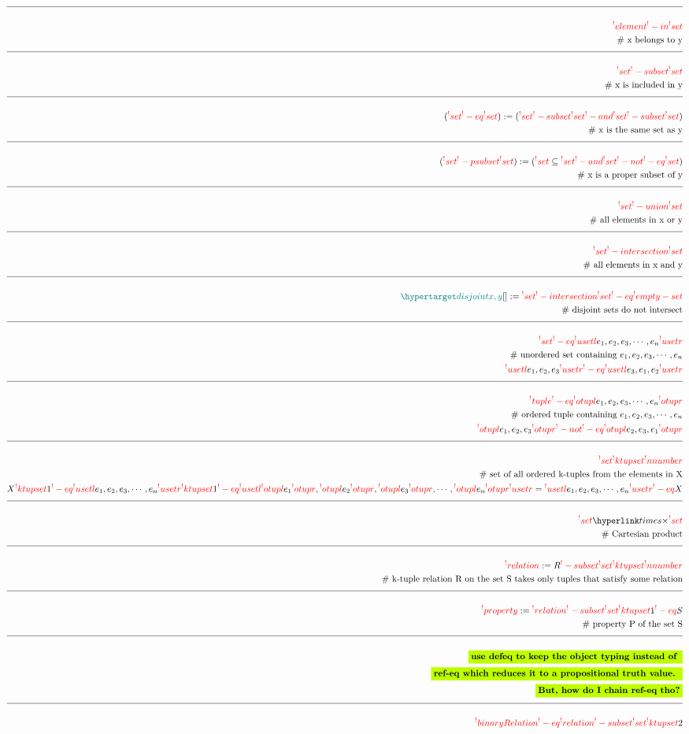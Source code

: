 \documentclass[a4paper]{article}
\newcommand{\tdb}[1]{\colorbox{lime}{$\displaystyle #1$}}
\newcommand{\defeq}{:=}
\newcommand{\enlist}[2]{{#1}_{1}, {#1}_{2}, {#1}_{3}, \cdots, {#1}_{#2}}
\newcommand{\eqComment}[1]{\text{  \# #1}}
\newcommand{\n}{\\[1.5ex] \hline \nonumber \\[0ex]}
\newcommand{\m}{\nonumber \\}
\begin{document}
\begin{tcolorbox}
\begin{align}
\n \rfr{element} [x][] \rfr{-in} \rfr{set} [y][] %
\m \eqComment{x belongs to y}
\n \rfr{set} [x][] \rfr{-subset} \rfr{set} [y][]
\m \eqComment{x is included in y}
\n (\rfr{set} [x][] \rfr{-eq} \rfr{set} [y][]) \defeq (\rfr{set} [x][] \rfr{-subset} \rfr{set} [y][] \rfr{-and} \rfr{set} [y][] \rfr{-subset} \rfr{set} [x][])
\m \eqComment{x is the same set as y}
\n (\rfr{set} [x][] \rfr{-psubset} \rfr{set} [y][]) \defeq (\rfr{set} [x][] \subseteq \rfr{set} [y][] \rfr{-and} \rfr{set} [x][] \rfr{-not} \rfr{-eq} \rfr{set} [y][])
\m \eqComment{x is a proper subset of y}
\n \rfr{set} [x][] \rfr{-union} \rfr{set} [y][]
\m \eqComment{all elements in x or y}
\n \rfr{set} [x][] \rfr{-intersection} \rfr{set} [y][]
\m \eqComment{all elements in x and y}
\n \dfn{disjoint} [x, y][] \defeq \rfr{set} [x][] \rfr{-intersection} \rfr{set} [y][] \rfr{-eq} \rfr{empty-set}
\m \eqComment{disjoint sets do not intersect}
\n \rfr{set} [E][] \rfr{-eq} \rfr{usetl} \enlist{e}{n} \rfr{usetr}
\m \eqComment{unordered set containing $\enlist{e}{n}$}
\m \rfr{usetl} e_1, e_2, e_3 \rfr{usetr} \rfr{-eq} \rfr{usetl} e_3, e_1, e_2 \rfr{usetr}
\n \rfr{tuple} [E][] \rfr{-eq} \rfr{otupl} \enlist{e}{n} \rfr{otupr} 
\m \eqComment{ordered tuple containing $\enlist{e}{n}$}
\m \rfr{otupl} e_1, e_2, e_3 \rfr{otupr} \rfr{-not} \rfr{-eq} \rfr{otupl} e_2, e_3, e_1 \rfr{otupr}
\n \rfr{set} [X][] \rfr{ktupset} \rfr{nnumber} [k][]
\m \eqComment{set of all ordered k-tuples from the elements in X}
\m X \rfr{ktupset} 1 \rfr{-eq} \rfr{usetl} \enlist{e}{n} \rfr{usetr} \rfr{ktupset} 1 \rfr{-eq} \rfr{usetl} \rfr{otupl} e_1 \rfr{otupr}, \rfr{otupl} e_2 \rfr{otupr}, \rfr{otupl} e_3 \rfr{otupr}, \cdots, \rfr{otupl} e_n \rfr{otupr} \rfr{usetr} = \rfr{usetl} \enlist{e}{n} \rfr{usetr} \rfr{-eq} X
\n \rfr{set} [Y][] \rfr{times} \rfr{set} [Z][]
\m \eqComment{Cartesian product}
\n \rfr{relation} [R][S, k] \defeq R \rfr{-subset} \rfr{set} [S][] \rfr{ktupset} \rfr{nnumber} [k][]
\m \eqComment{k-tuple relation R on the set S takes only tuples that satisfy some relation}
\n \rfr{property} [P][S] \defeq \rfr{relation} [P][S, 1] \rfr{-subset} \rfr{set} [S][] \rfr{ktupset} 1 \rfr{-eq} S
\m \eqComment{property P of the set S}
\n \tdb{\textbf{use defeq to keep the object typing instead of }}
\m \tdb{\textbf{ref-eq which reduces it to a propositional truth value. }}
\m \tdb{\textbf{But, how do I chain ref-eq tho?}}
\n \rfr{binaryRelation} [B][S] \rfr{-eq} \rfr{relation} [B][S, 2] \rfr{-subset} \rfr{set} [S][] \rfr{ktupset} 2

\end{align}
\end{tcolorbox}
\end{document}
